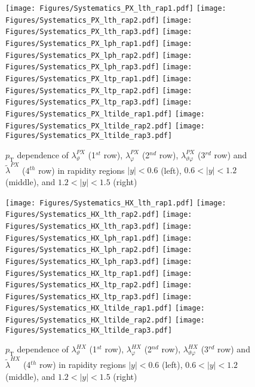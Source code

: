 \documentclass[12pt]{article}
\newcommand{\pT}{p_\mathrm{T}}
\newcommand{\absy}{\left |  y \right |}
\newcommand{\lamthHX}{\lambda^{\scriptscriptstyle HX}_\vartheta}
\newcommand{\lamphHX}{\lambda^{\scriptscriptstyle HX}_\varphi}
\newcommand{\lamthphHX}{\lambda^{\scriptscriptstyle HX}_{\vartheta \varphi}}
\newcommand{\lamtildeHX}{\tilde{\lambda}^{\scriptscriptstyle HX}}
\newcommand{\lamthPX}{\lambda^{\scriptscriptstyle PX}_\vartheta}
\newcommand{\lamphPX}{\lambda^{\scriptscriptstyle PX}_\varphi}
\newcommand{\lamthphPX}{\lambda^{\scriptscriptstyle PX}_{\vartheta \varphi}}
\newcommand{\lamtildePX}{\tilde{\lambda}^{\scriptscriptstyle PX}}
\begin{document}



\begin{figure}[htbp]
\centering
\texttt{[image: Figures/Systematics\_PX\_lth\_rap1.pdf]}
\texttt{[image: Figures/Systematics\_PX\_lth\_rap2.pdf]}
\texttt{[image: Figures/Systematics\_PX\_lth\_rap3.pdf]}
\texttt{[image: Figures/Systematics\_PX\_lph\_rap1.pdf]}
\texttt{[image: Figures/Systematics\_PX\_lph\_rap2.pdf]}
\texttt{[image: Figures/Systematics\_PX\_lph\_rap3.pdf]}
\texttt{[image: Figures/Systematics\_PX\_ltp\_rap1.pdf]}
\texttt{[image: Figures/Systematics\_PX\_ltp\_rap2.pdf]}
\texttt{[image: Figures/Systematics\_PX\_ltp\_rap3.pdf]}
\texttt{[image: Figures/Systematics\_PX\_ltilde\_rap1.pdf]}
\texttt{[image: Figures/Systematics\_PX\_ltilde\_rap2.pdf]}
\texttt{[image: Figures/Systematics\_PX\_ltilde\_rap3.pdf]}
\caption{$\pT$ dependence of $\lamthPX$
(1$^{st}$ row), $\lamphPX$ (2$^{nd}$ row), $\lamthphPX$ (3$^{rd}$ row) and 
$\lamtildePX$ (4$^{th}$ row) in rapidity regions $\absy<0.6$ (left),  
$0.6<\absy<1.2$ (middle), and $1.2<\absy<1.5$ (right)}
\end{figure}
\clearpage







\begin{figure}[htbp]
\centering
\texttt{[image: Figures/Systematics\_HX\_lth\_rap1.pdf]}
\texttt{[image: Figures/Systematics\_HX\_lth\_rap2.pdf]}
\texttt{[image: Figures/Systematics\_HX\_lth\_rap3.pdf]}
\texttt{[image: Figures/Systematics\_HX\_lph\_rap1.pdf]}
\texttt{[image: Figures/Systematics\_HX\_lph\_rap2.pdf]}
\texttt{[image: Figures/Systematics\_HX\_lph\_rap3.pdf]}
\texttt{[image: Figures/Systematics\_HX\_ltp\_rap1.pdf]}
\texttt{[image: Figures/Systematics\_HX\_ltp\_rap2.pdf]}
\texttt{[image: Figures/Systematics\_HX\_ltp\_rap3.pdf]}
\texttt{[image: Figures/Systematics\_HX\_ltilde\_rap1.pdf]}
\texttt{[image: Figures/Systematics\_HX\_ltilde\_rap2.pdf]}
\texttt{[image: Figures/Systematics\_HX\_ltilde\_rap3.pdf]}
\caption{$\pT$ dependence of $\lamthHX$
(1$^{st}$ row), $\lamphHX$ (2$^{nd}$ row), $\lamthphHX$ (3$^{rd}$ row) and 
$\lamtildeHX$ (4$^{th}$ row) in rapidity regions $\absy<0.6$ (left),  
$0.6<\absy<1.2$ (middle), and $1.2<\absy<1.5$ (right)}
\end{figure}
\clearpage
\end{document}
